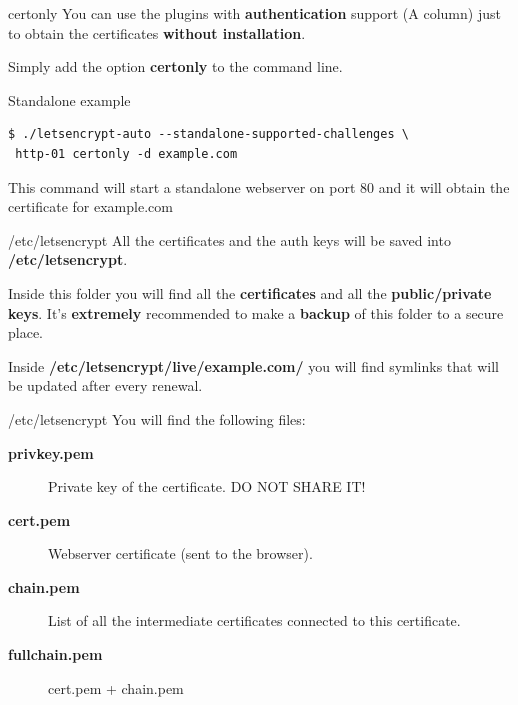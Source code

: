 \documentclass[xcolor=svgnames,11pt]{beamer}
\begin{document}
\begin{frame}[fragile]{certonly}
You can use the plugins with \textbf{authentication} support (A column) just to obtain the certificates \textbf{without installation}.

\medskip\pause

Simply add the option \textbf{certonly} to the command line.

\medskip

\begin{block}{Standalone example}

\begin{scriptsize}
\begin{verbatim}
$ ./letsencrypt-auto --standalone-supported-challenges \
 http-01 certonly -d example.com
\end{verbatim}
\end{scriptsize}

This command will start a standalone webserver on port 80 and it will obtain the certificate for example.com
\end{block}
\end{frame}

\begin{frame}{/etc/letsencrypt}
All the certificates and the auth keys will be saved into
\textbf{/etc/letsencrypt}.

\medskip\pause
{
\begin{block}{}
Inside this folder you will find all the \textbf{certificates} and all the \textbf{public/private keys}.
It's \textbf{extremely} recommended to make a \textbf{backup} of this folder to a secure place.
\end{block}
}
\medskip\pause
Inside \textbf{/etc/letsencrypt/live/example.com/} you will find symlinks that will be updated after every renewal.
\end{frame}

\begin{frame}{/etc/letsencrypt}
You will find the following files:
\begin{description}
  \item[\textbf{\small privkey.pem}] Private key of the certificate. DO NOT SHARE IT!
  \item[\textbf{\small cert.pem}] Webserver certificate (sent to the browser).
  \item[\textbf{\small chain.pem}] List of all the intermediate certificates connected to this certificate.
  \item[\textbf{\small fullchain.pem}] cert.pem + chain.pem
\end{description}
\end{frame}
\end{document}
